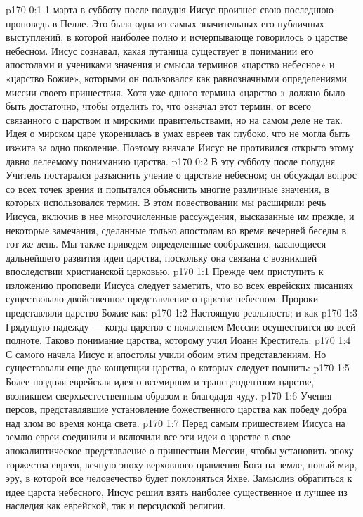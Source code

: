 \author{Комиссия срединников}
\vs p170 0:1 1 марта в субботу после полудня Иисус произнес свою последнюю проповедь в Пелле. Это была одна из самых значительных его публичных выступлений, в которой наиболее полно и исчерпывающе говорилось о царстве небесном. Иисус сознавал, какая путаница существует в понимании его апостолами и учениками значения и смысла терминов «царство небесное» и «царство Божие», которыми он пользовался как равнозначными определениями миссии своего пришествия. Хотя уже одного термина «царство  » должно было быть достаточно, чтобы отделить то, что означал этот термин, от всего связанного с  царством и мирскими правительствами, но на самом деле не так. Идея о мирском царе укоренилась в умах евреев так глубоко, что не могла быть изжита за одно поколение. Поэтому вначале Иисус не противился открыто этому давно лелеемому пониманию царства.
\vs p170 0:2 В эту субботу после полудня Учитель постарался разъяснить учение о царствие небесном; он обсуждал вопрос со всех точек зрения и попытался объяснить многие различные значения, в которых использовался термин. В этом повествовании мы расширили речь Иисуса, включив в нее многочисленные рассуждения, высказанные им прежде, и некоторые замечания, сделанные только апостолам во время вечерней беседы в тот же день. Мы также приведем определенные соображения, касающиеся дальнейшего развития идеи царства, поскольку она связана с возникшей впоследствии христианской церковью.
\vs p170 1:1 Прежде чем приступить к изложению проповеди Иисуса следует заметить, что во всех еврейских писаниях существовало двойственное представление о царстве небесном. Пророки представляли царство Божие как:
\vs p170 1:2 \bibnobreakspace Настоящую реальность; и как
\vs p170 1:3 \pc {}\bibnobreakspace Грядущую надежду --- когда царство с появлением Мессии осуществится во всей полноте. Таково понимание царства, которому учил Иоанн Креститель.
\vs p170 1:4 С самого начала Иисус и апостолы учили обоим этим представлениям. Но существовали еще две концепции царства, о которых следует помнить:
\vs p170 1:5 \pc {}\bibnobreakspace Более поздняя еврейская идея о всемирном и трансцендентном царстве, возникшем сверхъестественным образом и благодаря чуду.
\vs p170 1:6 \pc {}\bibnobreakspace Учения персов, представлявшие установление божественного царства как победу добра над злом во время конца света.
\vs p170 1:7 \pc Перед самым пришествием Иисуса на землю евреи соединили и включили все эти идеи о царстве в свое апокалиптическое представление о пришествии Мессии, чтобы установить эпоху торжества евреев, вечную эпоху верховного правления Бога на земле, новый мир, эру, в которой все человечество будет поклоняться Яхве. Замыслив обратиться к идее царста небесного, Иисус решил взять наиболее существенное и лучшее из наследия как еврейской, так и персидской религии.
